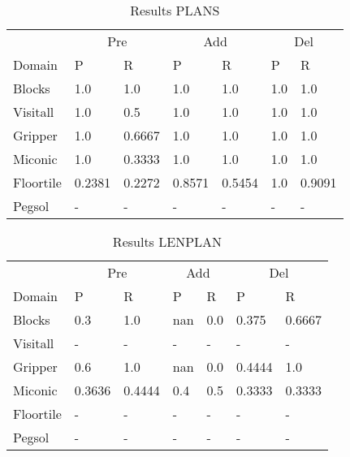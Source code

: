 \documentclass[]{article}
\title{}
\author{}
\begin{document}
\maketitle

%

\section{}
\begin{table}
	\caption{Results PLANS}
	\label{tab:results_plans}
	\begin{center}
		\begin{tabular}{l|l|l|l|l|l|l|}
			 & \multicolumn{2}{|c|}{Pre} & \multicolumn{2}{|c|}{Add} & \multicolumn{2}{|c|}{Del}  \\ \cline{2-7}			 
			 Domain & P & R & P & R & P & R \\
			\hline
			Blocks & 1.0 & 1.0 & 1.0 & 1.0 & 1.0 & 1.0 \\
			Visitall & 1.0 & 0.5 & 1.0 & 1.0 & 1.0 & 1.0 \\
			Gripper & 1.0 & 0.6667 & 1.0 & 1.0 & 1.0 & 1.0 \\
			Miconic & 1.0 & 0.3333 & 1.0 & 1.0 & 1.0 & 1.0 \\
			Floortile & 0.2381 & 0.2272 & 0.8571 & 0.5454 & 1.0 & 0.9091 \\
			Pegsol & - & - & - & - & - & - \\
		\end{tabular}
	\end{center}	
\end{table}

\begin{table}
	\caption{Results LENPLAN}
	\label{tab:results_lenplan}
	\begin{center}
		\begin{tabular}{l|l|l|l|l|l|l|}
			& \multicolumn{2}{|c|}{Pre} & \multicolumn{2}{|c|}{Add} & \multicolumn{2}{|c|}{Del}  \\ \cline{2-7}			 
			Domain & P & R & P & R & P & R \\
			\hline
			Blocks & 0.3 & 1.0 & nan & 0.0 & 0.375 & 0.6667 \\
			Visitall & - & - & - & - & - & - \\
			Gripper & 0.6 & 1.0 & nan & 0.0 & 0.4444 & 1.0 \\
			Miconic & 0.3636 & 0.4444 & 0.4 & 0.5 & 0.3333 & 0.3333 \\
			Floortile & - & - & - & - & - & - \\
			Pegsol & - & - & - & - & - & - \\
		\end{tabular}
	\end{center}	
\end{table}
\end{document}
